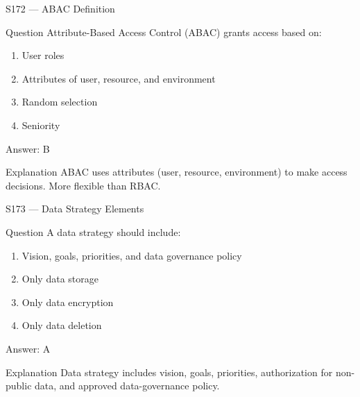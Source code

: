 \documentclass[aspectratio=169,8pt]{beamer}
\begin{document}
	\begin{frame}{S172 --- ABAC Definition}
		\begin{block}{Question}
			Attribute-Based Access Control (ABAC) grants access based on:
			\begin{enumerate}
				\item User roles
				\item Attributes of user, resource, and environment
				\item Random selection
				\item Seniority
			\end{enumerate}
		\end{block}
		\begin{exampleblock}{Answer: B}\end{exampleblock}
		\begin{block}{Explanation}
			ABAC uses attributes (user, resource, environment) to make access decisions. More flexible than RBAC.
		\end{block}
	\end{frame}
	
	\begin{frame}{S173 --- Data Strategy Elements}
		\begin{block}{Question}
			A data strategy should include:
			\begin{enumerate}
				\item Vision, goals, priorities, and data governance policy
				\item Only data storage
				\item Only data encryption
				\item Only data deletion
			\end{enumerate}
		\end{block}
		\begin{exampleblock}{Answer: A}\end{exampleblock}
		\begin{block}{Explanation}
			Data strategy includes vision, goals, priorities, authorization for non-public data, and approved data-governance policy.
		\end{block}
	\end{frame}
	
\end{document}
